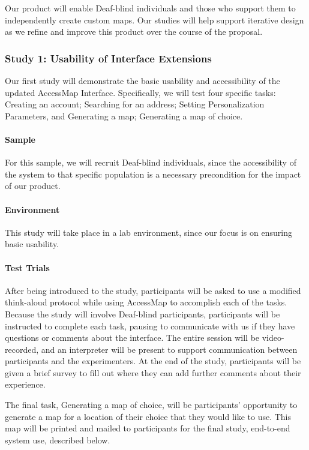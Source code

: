 Our product will enable Deaf-blind individuals and those who support them  to independently create custom maps. Our studies will help support iterative design as we  refine and improve this product over the course of the proposal.

\subsubsection{Study 1: Usability of Interface Extensions}
Our first study will demonstrate the basic usability and accessibility of the updated AccessMap Interface. Specifically, we will test four specific tasks: Creating an account; Searching for an address; Setting Personalization Parameters, and Generating a map; Generating a map of choice.

\paragraph{Sample} For this sample, we will recruit Deaf-blind individuals, since the accessibility of the system to that specific population is a necessary precondition for the impact of our product. 

\paragraph{Environment} This study will take place in a lab environment, since our focus is on ensuring basic usability.

\paragraph{Test Trials}
After being introduced to the study, participants will be asked to use a modified think-aloud protocol while using AccessMap to accomplish each of the tasks. Because the study will involve Deaf-blind participants, participants will be instructed to complete each task, pausing to communicate with us if they have questions or comments about the interface. The entire session will be video-recorded, and an interpreter will be present to support communication between participants and the experimenters. At the end of the study, participants will be given a brief survey to fill out where they can add further comments about their experience. 

The final task, Generating a map of choice, will be participants' opportunity to generate a map for a location of their choice that they would like to use. This map will be printed and mailed to participants for the final study, end-to-end system use, described below. 

